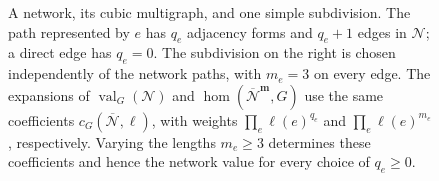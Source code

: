 \documentclass[10pt,a4paper]{article}
\theoremstyle{plain}
\theoremstyle{definition}
\DeclareMathOperator{\val}{val}
\begin{document}
\begin{figure}[tb]
\caption{A network, its cubic multigraph, and one simple subdivision.
The path represented by $e$ has $q_e$ adjacency forms and $q_e+1$ edges in $\mathcal N$;
a direct edge has $q_e=0$.
The subdivision on the right is chosen independently of the network paths,
with $m_e=3$ on every edge.
The expansions of $\val_G(\mathcal N)$ and $\hom(\overline{\mathcal N}^{\mathbf m},G)$
use the same coefficients $c_G(\overline{\mathcal N},\ell)$, with weights
$\prod_e\ell(e)^{q_e}$ and $\prod_e\ell(e)^{m_e}$, respectively.
Varying the lengths $m_e\geq3$ determines these coefficients and hence
the network value for every choice of $q_e\geq0$.}
\label{fig:network-subdivision}
\end{figure}
\end{document}
